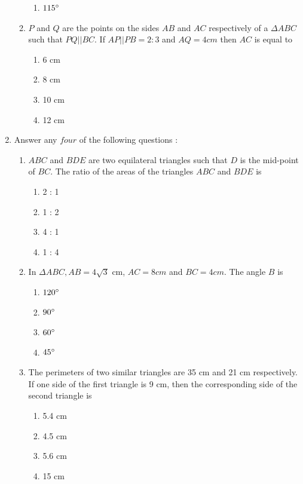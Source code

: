 \documentclass{article}
\begin{document}
\begin{enumerate}
\begin{enumerate}
\begin{enumerate}
					\item $ 115{\degree} $
				\end{enumerate}
			\item $ P $ and $ Q $ are the points on the sides $ AB $ and $ AC $ respectively of a 
				$ \Delta ABC $ such that $ PQ || BC $. If $ AP || PB = 2 : 3 $ and $ AQ = 4 cm 
				$ then $ AC $ is equal to
				\begin{enumerate}
					\item 6 cm 
					\item 8 cm
					\item 10 cm
					\item 12 cm
				\end{enumerate}
		\end{enumerate}
	\item Answer any $ four $ of the following questions :
		\begin{enumerate}
			\item $ ABC $ and $ BDE $ are two equilateral triangles such that $ D $ is the mid-point 
				of $ BC $. The ratio of the areas of the triangles $ ABC $ and $ BDE $ is
				\begin{enumerate}
					\item 2 : 1
					\item 1 : 2
					\item 4 : 1
					\item 1 : 4
				\end{enumerate}
			\item In $ \Delta ABC, AB = 4 \sqrt{3} $ cm, $ AC = 8 cm $ and $ BC = 4 cm $. The angle 
				$ B $ is
				\begin{enumerate}
					\item $ 120{\degree} $
					\item $ 90{\degree} $
					\item $ 60{\degree} $
					\item $ 45{\degree} $
				\end{enumerate}
			\item The perimeters of two similar triangles are 35 cm and 21 cm respectively. If one 
				side of the first triangle is 9 cm, then the corresponding side of the second 
				triangle is
				\begin{enumerate}
					\item 5.4 cm
					\item 4.5 cm
					\item 5.6 cm
					\item 15 cm
				\end{enumerate}

\end{enumerate}
\end{enumerate}
\end{document}
